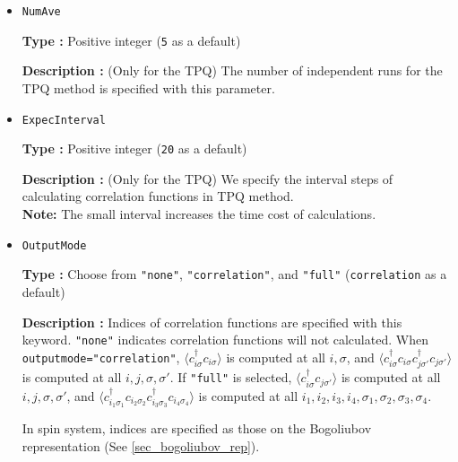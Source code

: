 \begin{itemize}
\item \verb|NumAve|

{\bf Type :} Positive integer (\verb|5| as a default)

{\bf Description :} (Only for the TPQ) The number of independent runs for the TPQ method is specified 
with this parameter.

\item \verb|ExpecInterval|

{\bf Type :} Positive integer (\verb|20| as a default)

{\bf Description :} (Only for the TPQ) 
We specify the interval steps of calculating correlation functions in TPQ method.\\ 
{\bf Note:} The small interval increases the time cost of calculations.

\item \verb|OutputMode|

{\bf Type :} Choose from \verb|"none"|, \verb|"correlation"|, and \verb|"full"|
(\verb|correlation| as a default)

{\bf Description :} Indices of correlation functions
are specified with this keyword.
\verb|"none"| indicates correlation functions will not calculated.
When \verb|outputmode="correlation"|,
$\langle c_{i \sigma}^{\dagger}c_{i \sigma} \rangle$ is computed at all $i, \sigma$,
and
$\langle c_{i \sigma}^{\dagger}c_{i \sigma} c_{j \sigma'}^{\dagger}c_{j \sigma'} \rangle$
is computed at all $i, j, \sigma, \sigma'$.
If \verb|"full"| is selected,
$\langle c_{i \sigma}^{\dagger}c_{j \sigma'} \rangle$ is computed at all $i, j, \sigma, \sigma'$,
and
$\langle c_{i_1 \sigma_1}^{\dagger}c_{i_2 \sigma_2} c_{i_3 \sigma_3}^{\dagger}c_{i_4 \sigma_4} \rangle$
is computed at all $i_1, i_2, i_3, i_4, \sigma_1, \sigma_2, \sigma_3, \sigma_4$.

In spin system, 
indices are specified as those on the Bogoliubov representation
(See \ref{sec_bogoliubov_rep}).

\end{itemize}

